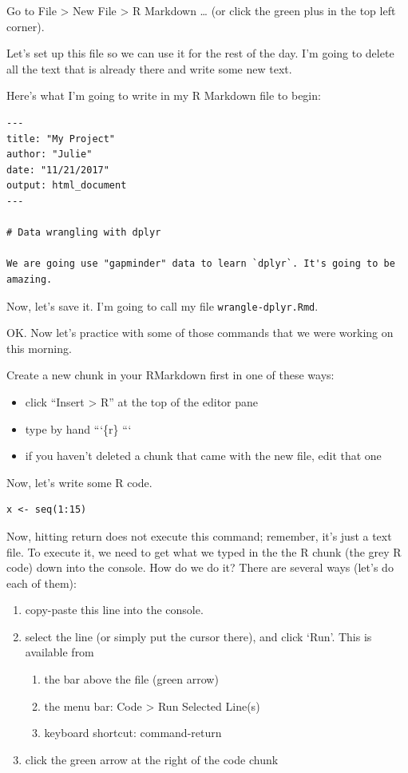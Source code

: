 \documentclass[]{book}
\providecommand{\tightlist}{%
  \setlength{\itemsep}{0pt}\setlength{\parskip}{0pt}}
\theoremstyle{definition}
\theoremstyle{definition}
\theoremstyle{definition}
\theoremstyle{remark}
\begin{document}
Go to File \textgreater{} New File \textgreater{} R Markdown \ldots{}
(or click the green plus in the top left corner).

Let's set up this file so we can use it for the rest of the day. I'm
going to delete all the text that is already there and write some new
text.

Here's what I'm going to write in my R Markdown file to begin:

\begin{verbatim}
---
title: "My Project"
author: "Julie"
date: "11/21/2017"
output: html_document
---

# Data wrangling with dplyr

We are going use "gapminder" data to learn `dplyr`. It's going to be amazing. 
\end{verbatim}

Now, let's save it. I'm going to call my file
\texttt{wrangle-dplyr.Rmd}.

OK. Now let's practice with some of those commands that we were working
on this morning.

Create a new chunk in your RMarkdown first in one of these ways:

\begin{itemize}
\tightlist
\item
  click ``Insert \textgreater{} R'' at the top of the editor pane
\item
  type by hand ```\{r\} ```
\item
  if you haven't deleted a chunk that came with the new file, edit that
  one
\end{itemize}

Now, let's write some R code.

\begin{verbatim}
x <- seq(1:15)
\end{verbatim}

Now, hitting return does not execute this command; remember, it's just a
text file. To execute it, we need to get what we typed in the the R
chunk (the grey R code) down into the console. How do we do it? There
are several ways (let's do each of them):

\begin{enumerate}
\def\labelenumi{\arabic{enumi}.}
\tightlist
\item
  copy-paste this line into the console.
\item
  select the line (or simply put the cursor there), and click `Run'.
  This is available from

  \begin{enumerate}
  \def\labelenumii{\alph{enumii}.}
  \tightlist
  \item
    the bar above the file (green arrow)
  \item
    the menu bar: Code \textgreater{} Run Selected Line(s)
  \item
    keyboard shortcut: command-return
  \end{enumerate}
\item
  click the green arrow at the right of the code chunk
\end{enumerate}
\end{document}

